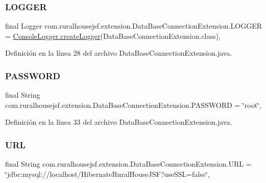 \subsubsection{\texorpdfstring{LOGGER}{LOGGER}}
{\footnotesize\ttfamily final Logger com.\+ruralhousejsf.\+extension.\+Data\+Base\+Connection\+Extension.\+L\+O\+G\+G\+ER = \mbox{\hyperlink{classcom_1_1ruralhousejsf_1_1logger_1_1_console_logger_a520321643663e37d95761134a35505cd}{Console\+Logger.\+create\+Logger}}(Data\+Base\+Connection\+Extension.\+class)\hspace{0.3cm}{\ttfamily [static]}, {\ttfamily [private]}}



Definición en la línea 28 del archivo Data\+Base\+Connection\+Extension.\+java.

\mbox{\label{classcom_1_1ruralhousejsf_1_1extension_1_1_data_base_connection_extension_a8b37073a138c653895098f4a0c0f661f}} 
\subsubsection{\texorpdfstring{PASSWORD}{PASSWORD}}
{\footnotesize\ttfamily final String com.\+ruralhousejsf.\+extension.\+Data\+Base\+Connection\+Extension.\+P\+A\+S\+S\+W\+O\+RD = \char`\"{}root\char`\"{}\hspace{0.3cm}{\ttfamily [static]}, {\ttfamily [private]}}



Definición en la línea 33 del archivo Data\+Base\+Connection\+Extension.\+java.

\mbox{\label{classcom_1_1ruralhousejsf_1_1extension_1_1_data_base_connection_extension_aec89224948925eb2f40d169ba4dc00a9}} 
\subsubsection{\texorpdfstring{URL}{URL}}
{\footnotesize\ttfamily final String com.\+ruralhousejsf.\+extension.\+Data\+Base\+Connection\+Extension.\+U\+RL = \char`\"{}jdbc\+:mysql\+://localhost/Hibernate\+Rural\+House\+J\+SF?use\+S\+SL=false\char`\"{}\hspace{0.3cm}{\ttfamily [static]}, {\ttfamily [private]}}



